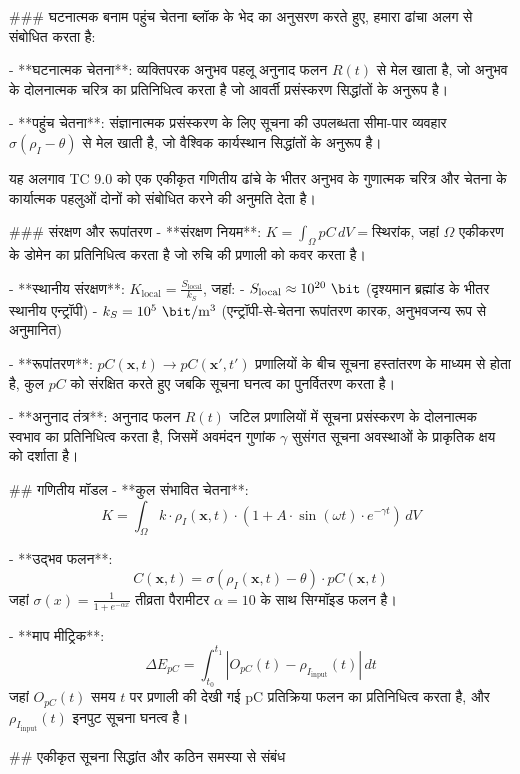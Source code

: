 ### घटनात्मक बनाम पहुंच चेतना
ब्लॉक के भेद का अनुसरण करते हुए, हमारा ढांचा अलग से संबोधित करता है:

- **घटनात्मक चेतना**: व्यक्तिपरक अनुभव पहलू अनुनाद फलन $R(t)$ से मेल खाता है, जो अनुभव के दोलनात्मक चरित्र का प्रतिनिधित्व करता है जो आवर्ती प्रसंस्करण सिद्धांतों के अनुरूप है।
    
- **पहुंच चेतना**: संज्ञानात्मक प्रसंस्करण के लिए सूचना की उपलब्धता सीमा-पार व्यवहार $\sigma(\rho_I - \theta)$ से मेल खाती है, जो वैश्विक कार्यस्थान सिद्धांतों के अनुरूप है।

यह अलगाव TC 9.0 को एक एकीकृत गणितीय ढांचे के भीतर अनुभव के गुणात्मक चरित्र और चेतना के कार्यात्मक पहलुओं दोनों को संबोधित करने की अनुमति देता है।

### संरक्षण और रूपांतरण
- **संरक्षण नियम**: $K = \int_{\Omega} pC \, dV = \text{स्थिरांक}$, जहां $\Omega$ एकीकरण के डोमेन का प्रतिनिधित्व करता है जो रुचि की प्रणाली को कवर करता है।
    
- **स्थानीय संरक्षण**: $K_{\text{local}} = \frac{S_{\text{local}}}{k_S}$, जहां:
  - $S_{\text{local}} \approx 10^{20}~\bit$ (दृश्यमान ब्रह्मांड के भीतर स्थानीय एन्ट्रॉपी)
  - $k_S = 10^{5}~\bit/\text{m}^3$ (एन्ट्रॉपी-से-चेतना रूपांतरण कारक, अनुभवजन्य रूप से अनुमानित)
    
- **रूपांतरण**: $pC(\mathbf{x}, t) \rightarrow pC(\mathbf{x'}, t')$ प्रणालियों के बीच सूचना हस्तांतरण के माध्यम से होता है, कुल $pC$ को संरक्षित करते हुए जबकि सूचना घनत्व का पुनर्वितरण करता है।
    
- **अनुनाद तंत्र**: अनुनाद फलन $R(t)$ जटिल प्रणालियों में सूचना प्रसंस्करण के दोलनात्मक स्वभाव का प्रतिनिधित्व करता है, जिसमें अवमंदन गुणांक $\gamma$ सुसंगत सूचना अवस्थाओं के प्राकृतिक क्षय को दर्शाता है।

## गणितीय मॉडल
- **कुल संभावित चेतना**: 
$$K = \int_{\Omega} k \cdot \rho_I(\mathbf{x}, t) \cdot \left(1 + A \cdot \sin(\omega t) \cdot e^{-\gamma t}\right) \, dV$$
    
- **उद्भव फलन**: 
$$C(\mathbf{x}, t) = \sigma(\rho_I(\mathbf{x}, t) - \theta) \cdot pC(\mathbf{x}, t)$$
जहां $\sigma(x) = \frac{1}{1 + e^{-\alpha x}}$ तीव्रता पैरामीटर $\alpha = 10$ के साथ सिग्मॉइड फलन है।
    
- **माप मीट्रिक**: 
$$\Delta E_{pC} = \int_{t_0}^{t_1} |O_{pC}(t) - \rho_{I_{\text{input}}}(t)| \, dt$$
जहां $O_{pC}(t)$ समय $t$ पर प्रणाली की देखी गई pC प्रतिक्रिया फलन का प्रतिनिधित्व करता है, और $\rho_{I_{\text{input}}}(t)$ इनपुट सूचना घनत्व है।

## एकीकृत सूचना सिद्धांत और कठिन समस्या से संबंध

